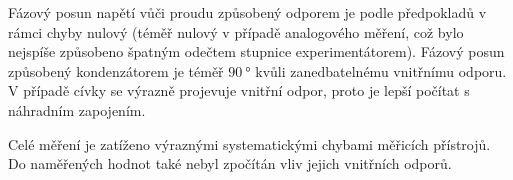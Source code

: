 \documentclass[0-protokol.tex]{subfiles}
\begin{document}
Fázový posun napětí vůči proudu způsobený odporem je podle předpokladů v rámci chyby nulový (téměř nulový v případě analogového měření, což bylo nejspíše způsobeno špatným odečtem stupnice experimentátorem). Fázový posun způsobený kondenzátorem je téměř $\SI{90}{\degree}$ kvůli zanedbatelnému vnitřnímu odporu. V případě cívky se výrazně projevuje vnitřní odpor, proto je lepší počítat s náhradním zapojením.

Celé měření je zatíženo výraznými systematickými chybami měřicích přístrojů. Do naměřených hodnot také nebyl zpočítán vliv jejich vnitřních odporů.
\end{document}
